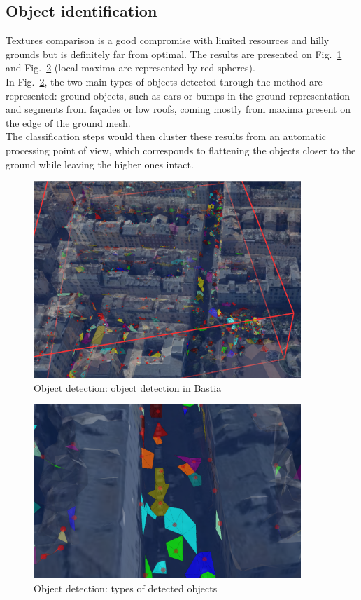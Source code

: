 \documentclass{kththesis}
\begin{document}
\subsection{Object identification}
Textures comparison is a good compromise with limited resources and hilly grounds but is definitely far from optimal. The results are presented on Fig.~\ref{fig:object_detection_global} and Fig.~\ref{fig:object_detection_closeup} (local maxima are represented by red spheres). \\
In Fig.~\ref{fig:object_detection_closeup}, the  two main types of objects detected through the method are represented: ground objects, such as cars or bumps in the ground representation and segments from façades or low roofs, coming mostly from maxima present on the edge of the ground mesh. \\
The classification steps would then cluster these results from an automatic processing point of view, which corresponds to flattening the objects closer to the ground while leaving the higher ones intact. 
\begin{figure}[H]
    \centering
    \includegraphics[width=0.9\textwidth]{images/Object_res/objects_from_local_maxima.png}
    \caption{Object detection: object detection in Bastia}
    \label{fig:object_detection_global}
\end{figure}
\begin{figure}[H]
    \centering
    \includegraphics[width=0.9\textwidth]{images/Object_res/types_of_objects_detected.png}
    \caption{Object detection: types of detected objects}
    \label{fig:object_detection_closeup}
\end{figure}
\end{document}
